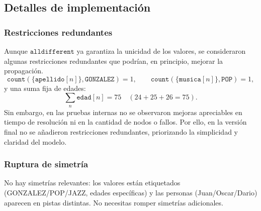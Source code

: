 
\subsection{Detalles de implementación}\label{sec:04-acertijo-logico-impl}
\subsubsection*{Restricciones redundantes}
Aunque \(\texttt{alldifferent}\) ya garantiza la unicidad de los valores, se consideraron algunas restricciones redundantes que podrían, en principio, mejorar la propagación.  
\[
\texttt{count}(\{\texttt{apellido}[n]\},\texttt{GONZALEZ}) = 1, \qquad
\texttt{count}(\{\texttt{musica}[n]\},\texttt{POP}) = 1,
\]
y una suma fija de edades:
\[
\sum_{n} \texttt{edad}[n] = 75 \quad (24 + 25 + 26 = 75).
\]
Sin embargo, en las pruebas internas no se observaron mejoras apreciables en tiempo de resolución ni en la cantidad de nodos o fallos. Por ello, en la versión final no se añadieron restricciones redundantes, priorizando la simplicidad y claridad del modelo.

\subsubsection*{Ruptura de simetría}
No hay simetrías relevantes: los valores están etiquetados (GONZALEZ/POP/JAZZ, edades específicas) y las personas (Juan/Oscar/Dario) aparecen en pistas distintas. No necesitas romper simetrías adicionales.
